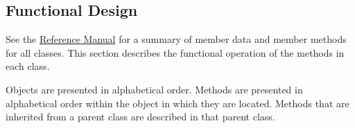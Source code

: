 %
%
% 
%


\subsection{Functional Design} \label{ref:FunctionalDesign}
See the \href{file:refman.pdf}{Reference Manual} 
\cite{timebib:ReferenceManual} for a summary of member data and member methods 
for all classes.  This section describes the functional operation of the 
methods in each class.

Objects are presented in alphabetical order.
Methods are presented in alphabetical order within the object in
which they are located.  
Methods that are inherited from a parent class
are described in that parent class.

